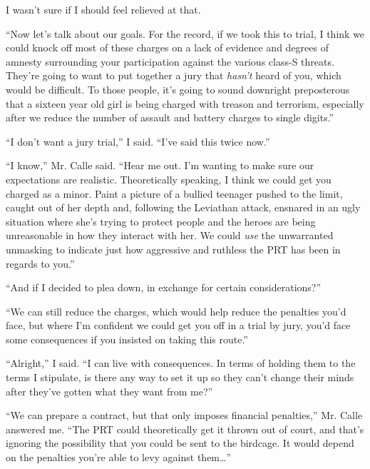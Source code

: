 I wasn't sure if I should feel relieved at that.



``Now let's talk about our goals.  For the record, if we took this to trial, I think we could knock off most of these charges on a lack of evidence and degrees of amnesty surrounding your participation against the various class-S threats.  They're going to want to put together a jury that \emph{hasn't} heard of you, which would be difficult.  To those people, it's going to sound downright preposterous that a sixteen year old girl is being charged with treason and terrorism, especially after we reduce the number of assault and battery charges to single digits.''



``I don't want a jury trial,'' I said.  ``I've said this twice now.''



``I know,'' Mr. Calle said. ``Hear me out.  I'm wanting to make sure our expectations are realistic.  Theoretically speaking, I think we could get you charged as a minor.  Paint a picture of a bullied teenager pushed to the limit, caught out of her depth and, following the Leviathan attack, ensnared in an ugly situation where she's trying to protect people and the heroes are being unreasonable in how they interact with her.  We could \emph{use} the unwarranted unmasking to indicate just how aggressive and ruthless the PRT has been in regards to you.''



``And if I decided to plea down, in exchange for certain considerations?''



``We can still reduce the charges, which would help reduce the penalties you'd face, but where I'm confident we could get you off in a trial by jury, you'd face some consequences if you insisted on taking this route.''



``Alright,'' I said.  ``I can live with consequences.  In terms of holding them to the terms I stipulate, is there any way to set it up so they can't change their minds after they've gotten what they want from me?''



``We can prepare a contract, but that only imposes financial penalties,'' Mr. Calle answered me.  ``The PRT could theoretically get it thrown out of court, and that's ignoring the possibility that you could be sent to the birdcage.  It would depend on the penalties you're able to levy against them\ldots''



